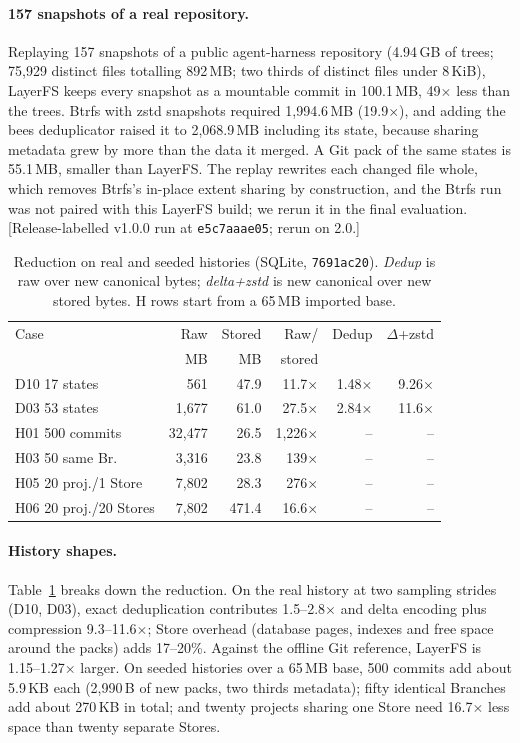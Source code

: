 \documentclass[letterpaper,twocolumn,10pt]{article}
\newif\ifdraft\drafttrue
\newcommand{\dnote}[1]{\ifdraft\textcolor{red!70!black}{\textsf{\small[#1]}}\fi}
\newcommand{\sys}{LayerFS}
\newcommand{\X}{$\times$}
\begin{document}
\paragraph{157 snapshots of a real repository.} Replaying 157 snapshots of a
public agent-harness repository (4.94\,GB of trees; 75,929 distinct files
totalling 892\,MB; two thirds of distinct files under 8\,KiB), \sys{} keeps
every snapshot as a mountable commit in 100.1\,MB, 49\X{} less than the
trees. Btrfs with zstd snapshots required 1,994.6\,MB (19.9\X{}), and adding
the bees deduplicator raised it to 2,068.9\,MB including its state, because
sharing metadata grew by more than the data it merged. A Git pack of the
same states is 55.1\,MB, smaller than \sys{}. The replay rewrites each
changed file whole, which removes Btrfs's in-place extent sharing by
construction, and the Btrfs run was not paired with this \sys{} build; we
rerun it in the final evaluation. \dnote{Release-labelled v1.0.0 run at
\texttt{e5c7aaae05}; rerun on 2.0.}

\begin{table}[t]
\centering
\small
\setlength{\tabcolsep}{2pt}
\begin{tabular}{l r r r r r}
\toprule
Case & Raw & Stored & Raw/ & Dedup & $\Delta$+zstd \\
 & MB & MB & stored & & \\
\midrule
D10 17 states & 561 & 47.9 & 11.7\X & 1.48\X & 9.26\X \\
D03 53 states & 1,677 & 61.0 & 27.5\X & 2.84\X & 11.6\X \\
H01 500 commits & 32,477 & 26.5 & 1,226\X & -- & -- \\
H03 50 same Br. & 3,316 & 23.8 & 139\X & -- & -- \\
H05 20 proj./1 Store & 7,802 & 28.3 & 276\X & -- & -- \\
H06 20 proj./20 Stores & 7,802 & 471.4 & 16.6\X & -- & -- \\
\bottomrule
\end{tabular}
\caption{Reduction on real and seeded histories (SQLite, \texttt{7691ac20}).
\emph{Dedup} is raw over new canonical bytes; \emph{delta+zstd} is new
canonical over new stored bytes. H rows start from a 65\,MB imported base.}
\label{tab:history}
\end{table}

\paragraph{History shapes.} Table~\ref{tab:history} breaks down the
reduction. On the real history at two sampling strides (D10, D03), exact
deduplication contributes 1.5--2.8\X{} and delta encoding plus compression
9.3--11.6\X; Store overhead (database pages, indexes and free space around
the packs) adds 17--20\%. Against the offline Git reference, \sys{} is
1.15--1.27\X{} larger. On seeded histories over a 65\,MB base, 500 commits
add about 5.9\,KB each (2,990\,B of new packs, two thirds metadata); fifty
identical Branches add about 270\,KB in total; and twenty projects sharing
one Store need 16.7\X{} less space than twenty separate Stores.
\end{document}
